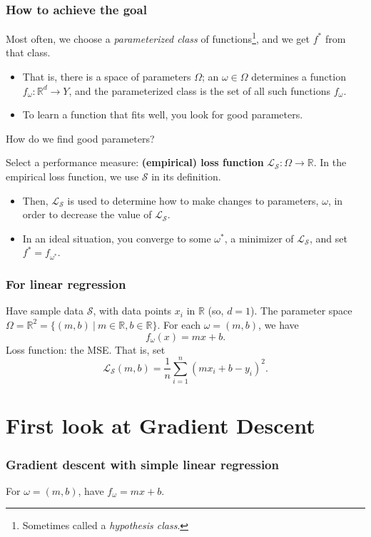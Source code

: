 \documentclass{beamer}
\theoremstyle{example}
\begin{document}
\begin{frame}
\frametitle{How to achieve the goal}
Most often, we choose a \textit{parameterized class} of functions\footnote{Sometimes called a \textit{hypothesis class}.}, and we get $f^*$ from that class. 
\pause
\begin{itemize}
    \item That is, there is a space of parameters $\Omega$; an $\omega\in\Omega$ determines a function $f_{\omega}:\mathbb R^d \to Y$, and the parameterized class is the set of all such functions $f_\omega$. %
    \pause
    \item To learn a function that fits well, you look for good parameters.
\end{itemize}

\pause
How do we find good parameters?

Select a performance measure: \textbf{(empirical) loss function} $\mathcal L_{\mathcal S}:\Omega \to \mathbb R$. In the empirical loss function, we use $\mathcal S$ in its definition.
\pause
\begin{itemize}
    \pause
    \item Then, $\mathcal L_{\mathcal S}$ is used to determine how to make changes to parameters, $\omega$, in order to decrease the value of $\mathcal L_{\mathcal S}$.
    \pause
    \item In an ideal situation, you converge to some $\omega^*$, a minimizer of $\mathcal L_{\mathcal S}$, and set $f^* = f_{\omega^*}$.
\end{itemize}

\end{frame}

\begin{frame}
    \frametitle{For linear regression}
    Have sample data $\mathcal S$, with data points $x_i$ in $\mathbb R$ (so, $d=1$). The parameter space $\Omega = \mathbb R^2 = \{(m,b)\ |\ m\in\mathbb R, b\in\mathbb R\}$. For each $\omega = (m,b)$, we have
        \[f_{\omega}(x) = mx + b.\]
    \pause
    Loss function: the MSE. That is, set 
        \[\mathcal L_{\mathcal S}(m,b) = \frac1{n}\sum_{i=1}^n (mx_i + b - y_i)^2.\]
\end{frame}

\section{First look at Gradient Descent}

\begin{frame}
\frametitle{Gradient descent with simple linear regression}
For $\omega = (m, b)$, have $f_{\omega} = mx + b$.
\pause 

\end{frame}
\end{document}
